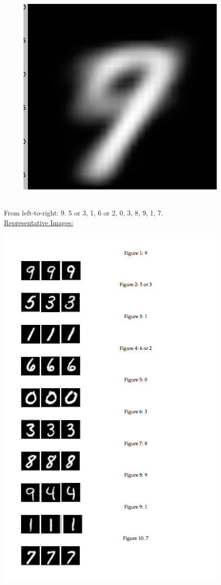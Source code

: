 \documentclass[submit]{harvardml}
\begin{document}
\begin{figure}[h]
	\includegraphics[scale=0.1]{./m1/9}
\end{figure}
\\ \noindent From left-to-right: 9. 5 or 3, 1, 6 or 2, 0, 3, 8, 9, 1, 7. \\ 
\underline{Representative Images:} \\ 
\centerline{\includegraphics[scale=0.6]{./lmap}}
\end{document}
